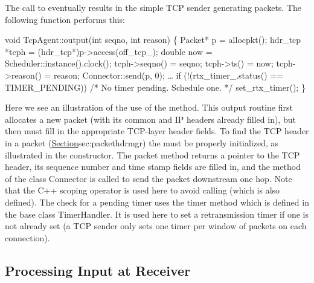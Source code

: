 The call to  eventually results in the simple TCP sender
generating packets.
The following function  performs this:
\begin{program}
        void TcpAgent::output(int seqno, int reason)
        \{
                Packet* p = allocpkt();
                hdr_tcp *tcph = (hdr_tcp*)p->access(off_tcp_);
                double now = Scheduler::instance().clock();
                tcph->seqno() = seqno;
                tcph->ts() = now;
                tcph->reason() = reason;
                Connector::send(p, 0);
                \ldots
                if (!(rtx_timer_.status() == TIMER_PENDING))
                        /* {\cf No timer pending.  Schedule one.} */
                        set_rtx_timer();
        \}
\end{program}
Here we see an illustration of the use of the  method.
This output routine first allocates a new packet
(with its common and IP headers already filled in), but then must fill
in the appropriate TCP-layer header fields.
To find the TCP header in a packet 
(\href{assuming it has been enabled}{Section}{sec:packethdrmgr})
the  must be properly initialized,
as illustrated in the constructor.
The packet  method returns a pointer to the TCP header,
its sequence number and time stamp fields are filled in,
and the  method of the class Connector is called
to send the packet downstream one hop.
Note that the C++ \code{::} scoping operator is used here to avoid
calling  (which is also defined).
The check for a pending timer uses the timer method  which
is defined in the base class TimerHandler.
It is used here to set a retransmission timer if one is not already set
(a TCP sender only sets one timer per window of packets on each connection).

\subsection{Processing Input at Receiver}
\label{sec:tcpsink}


